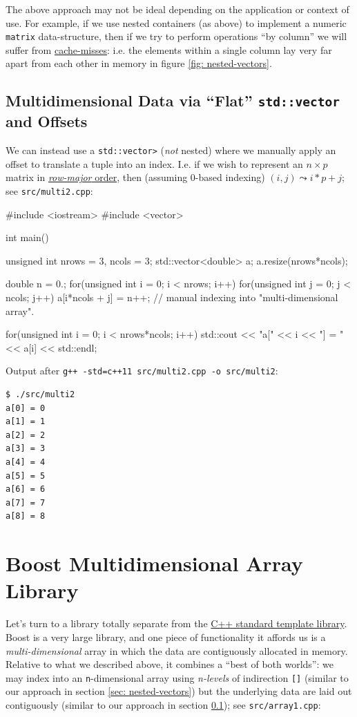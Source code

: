 \documentclass[12pt,letterpaper,twoside]{article}
\begin{document}
The above approach may not be ideal depending on the application or context of use. For example,
if we use nested containers (as above) to implement a numeric \texttt{matrix} data-structure, then
if we try to perform operations ``by column'' we will suffer from 
\href{https://en.wikipedia.org/wiki/CPU_cache#Cache_miss}{cache-misses}: i.e. the elements
within a single column lay very far apart from each other in memory in figure 
\ref{fig: nested-vectors}.

\subsection{Multidimensional Data via ``Flat'' \texttt{std::vector} and Offsets} 
\label{sec: multid-arr-via-offsets}
We can instead use a \texttt{std::vector>} (\emph{not} nested)
where we manually apply an offset to translate a tuple into an index. I.e. if we wish to represent
an $n \times p$ matrix in 
\href{https://en.wikipedia.org/wiki/Row-_and_column-major_order}{\emph{row-major} order}, 
then (assuming 0-based indexing) $(i,j) \leadsto i*p + j$; see
\texttt{src/multi2.cpp}:

\begin{cpp}
#include <iostream>
#include <vector>

int main() {
  unsigned int nrows = 3, ncols = 3;
  std::vector<double> a;
  a.resize(nrows*ncols);

  double n = 0.;
  for(unsigned int i = 0; i < nrows; i++)
    for(unsigned int j = 0; j < ncols; j++)
      a[i*ncols + j] = n++; // manual indexing into "multi-dimensional array".

  for(unsigned int i = 0; i < nrows*ncols; i++)
    std::cout << "a[" << i << "] = " << a[i] << std::endl;
}
\end{cpp}

Output after \texttt{g++ -std=c++11 src/multi2.cpp -o src/multi2}:

{\small
\begin{verbatim}
$ ./src/multi2
a[0] = 0
a[1] = 1
a[2] = 2
a[3] = 3
a[4] = 4
a[5] = 5
a[6] = 6
a[7] = 7
a[8] = 8
\end{verbatim}
}

\section{Boost Multidimensional Array Library}
Let's turn to a library totally separate from the 
\href{https://en.wikipedia.org/wiki/Standard_Template_Library}{C++ standard template library}.
Boost is a very large library, and one piece of functionality it affords us is a 
\emph{multi-dimensional} array in which the data are contiguously allocated in memory. Relative
to what we described above, it combines a ``best of both worlds'': we may index into 
an \texttt{n}-dimensional array using \emph{n-levels} of indirection \texttt{[]} 
(similar to our approach in section \ref{sec: nested-vectors}) but the underlying
data are laid out contiguously (similar to our approach in section 
\ref{sec: multid-arr-via-offsets}); see
\texttt{src/array1.cpp}:
\end{document}
